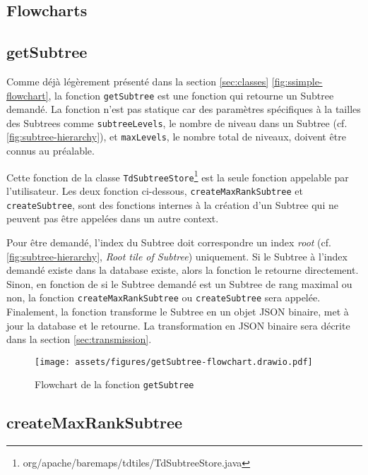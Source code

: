 \subsection{Flowcharts}

\subsection*{getSubtree}

Comme déjà légèrement présenté dans la section \ref{sec:classes} \autoref{fig:ssimple-flowchart}, la fonction \texttt{getSubtree} est une fonction qui retourne un Subtree demandé. La fonction n'est pas statique car des paramètres spécifiques à la tailles des Subtrees comme \texttt{subtreeLevels}, le nombre de niveau dans un Subtree (cf. \autoref{fig:subtree-hierarchy}), et \texttt{maxLevels}, le nombre total de niveaux, doivent être connus au préalable.

Cette fonction de la classe \texttt{TdSubtreeStore}\footnote{org/apache/baremaps/tdtiles/TdSubtreeStore.java} est la seule fonction appelable par l'utilisateur. Les deux fonction ci-dessous, \texttt{createMaxRankSubtree} et \texttt{createSubtree}, sont des fonctions internes à la création d'un Subtree qui ne peuvent pas être appelées dans un autre context.

Pour être demandé, l'index du Subtree doit correspondre un index \textit{root} (cf. \autoref{fig:subtree-hierarchy}, \textit{Root tile of Subtree}) uniquement. Si le Subtree à l'index demandé existe dans la database existe, alors la fonction le retourne directement. Sinon, en fonction de si le Subtree demandé est un Subtree de rang maximal ou non, la fonction \texttt{createMaxRankSubtree} ou \texttt{createSubtree} sera appelée. Finalement, la fonction transforme le Subtree en un objet JSON binaire, met à jour la database et le retourne. La transformation en JSON binaire sera décrite dans la section \ref{sec:transmission}.

\begin{figure}[H]
    \centering
    \texttt{[image: assets/figures/getSubtree-flowchart.drawio.pdf]}
    \caption{Flowchart de la fonction \texttt{getSubtree}}
    \label{fig:getsubtree-flowchart}
\end{figure}

\subsection*{createMaxRankSubtree}


